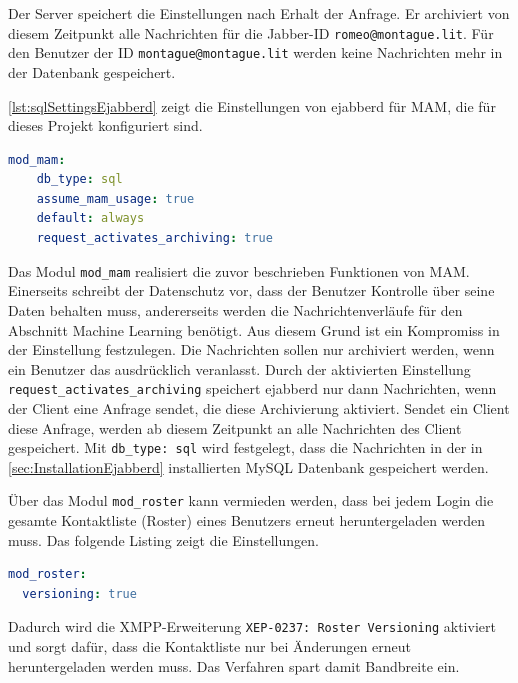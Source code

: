 \documentclass[a4paper,titlepage,halfparskip,12pt]{scrreprt}
\begin{document}
\begin{onehalfspacing}
Der Server speichert die Einstellungen nach Erhalt der Anfrage. Er archiviert von diesem Zeitpunkt alle Nachrichten für die Jabber-ID \texttt{romeo@montague.lit}. Für den Benutzer der ID \texttt{montague@montague.lit} werden keine Nachrichten mehr in der Datenbank gespeichert.

\autoref{lst:sqlSettingsEjabberd} zeigt die Einstellungen von ejabberd für \ac{MAM}, die für dieses Projekt konfiguriert sind.

\bigskip

\begin{lstlisting}[language=yaml, caption={Konfiguration der Einstellungen für die Nachrichtenarchivierung}, label={lst:sqlSettingsEjabberd}]
mod_mam:
    db_type: sql
    assume_mam_usage: true
    default: always
    request_activates_archiving: true
\end{lstlisting}

Das Modul \texttt{mod\_mam} realisiert die zuvor beschrieben Funktionen von \ac{MAM}. Einerseits schreibt der Datenschutz vor, dass der Benutzer Kontrolle über seine Daten behalten muss, andererseits werden die Nachrichtenverläufe für den Abschnitt Machine Learning benötigt. Aus diesem Grund ist ein Kompromiss in der Einstellung festzulegen. Die Nachrichten sollen nur archiviert werden, wenn ein Benutzer das ausdrücklich veranlasst. Durch der aktivierten Einstellung \texttt{request\_activates\_archiving} speichert ejabberd nur dann Nachrichten, wenn der Client eine Anfrage sendet, die diese Archivierung aktiviert. Sendet ein Client diese Anfrage, werden ab diesem Zeitpunkt an alle Nachrichten des Client gespeichert. Mit \texttt{db\_type: sql} wird festgelegt, dass die Nachrichten in der in \autoref{sec:InstallationEjabberd} installierten MySQL Datenbank gespeichert werden.

Über das Modul \texttt{mod\_roster} kann vermieden werden, dass bei jedem Login die gesamte Kontaktliste (Roster) eines Benutzers erneut heruntergeladen werden muss. Das folgende Listing zeigt die Einstellungen.

\bigskip

\begin{lstlisting}[language=yaml, caption={Einstellungen des Moduls mod\_rosters}]
mod_roster:
  versioning: true
\end{lstlisting}

Dadurch wird die \ac{XMPP}-Erweiterung \texttt{XEP-0237: Roster Versioning} \cite{xep0237RosterVersioning} aktiviert und sorgt dafür, dass die Kontaktliste nur bei Änderungen erneut heruntergeladen werden muss. Das Verfahren spart damit Bandbreite ein.


\end{onehalfspacing}
\end{document}
